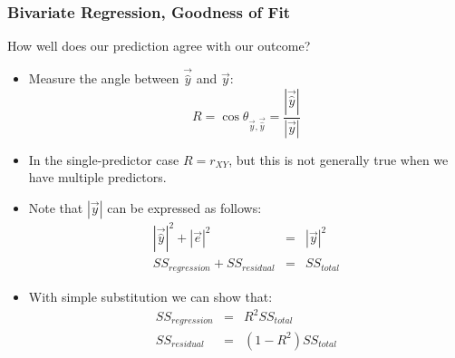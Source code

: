 \documentclass{beamer}
\begin{document}
\begin{frame}
  \frametitle{Bivariate Regression, Goodness of Fit}

How well does our prediction agree with our outcome?

\begin{itemize}
  \item Measure the angle between $\vec{\widehat{y}}$ and $\vec{y}$:
\[
R = \cos \theta_{\vec{y},\vec{\widehat{y}}} = \frac{|\vec{\widehat{y}}|}{|\vec{y}|}
\]

 \item In the single-predictor case $R = r_{XY}$, but this is not generally true when we have multiple predictors.

 \item Note that $|\vec{y}|$ can be expressed as follows:
\begin{eqnarray*}
|\vec{\widehat{y}}|^2 + |\vec{e}|^2 &=& |\vec{y}|^2 \\
SS_\mathit{regression} + SS_\mathit{residual} &=& SS_\mathit{total}
\end{eqnarray*}

 \item With simple substitution we can show that:
\begin{eqnarray*}
SS_\mathit{regression} &=& R^2 SS_\mathit{total} \\
SS_\mathit{residual} &=& (1-R^2)SS_\mathit{total}
\end{eqnarray*}

\end{itemize}


\end{frame}
\end{document}
